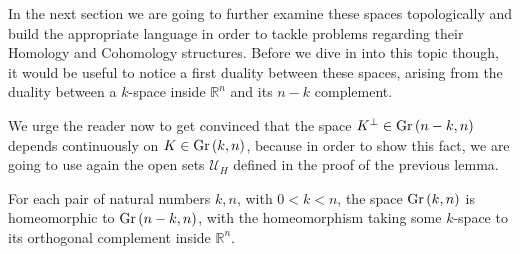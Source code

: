 In the next section we are going to further examine these spaces topologically and build the appropriate language in order to tackle problems regarding their Homology and Cohomology structures. Before we dive in into this topic though, it would be useful to notice a first duality between these spaces, arising from the duality between a $k$-space inside $\mathbb{R}^n$ and its $n-k$ complement.

We urge the reader now to get convinced that the space $K^{\perp}\in\Gr{n-k}{n}$ depends continuously on $K\in\Gr{k}{n}$, because in order to show this fact, we are going to use again the open sets $\mathcal{U}_H$ defined in the proof of the previous lemma.

\begin{lemma} For each pair of natural numbers $k,n$, with $0<k<n$, the space $\Gr{k}{n}$ is homeomorphic to $\Gr{n-k}{n}$, with the homeomorphism taking some $k$-space to its orthogonal complement inside $\mathbb{R}^n$.
\end{lemma}

